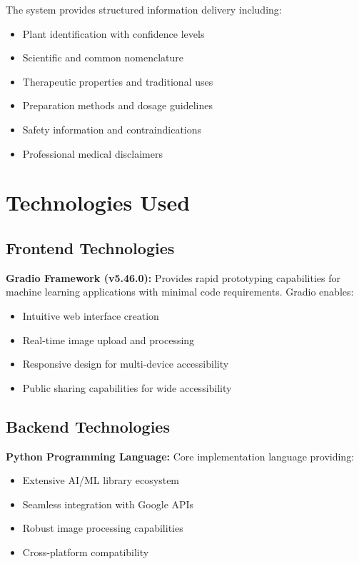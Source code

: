 \documentclass[conference]{IEEEtran}
\begin{document}
The system provides structured information delivery including:

\begin{itemize}
\item Plant identification with confidence levels
\item Scientific and common nomenclature
\item Therapeutic properties and traditional uses
\item Preparation methods and dosage guidelines
\item Safety information and contraindications
\item Professional medical disclaimers
\end{itemize}

\section{Technologies Used}

\subsection{Frontend Technologies}

\textbf{Gradio Framework (v5.46.0):} Provides rapid prototyping capabilities for machine learning applications with minimal code requirements. Gradio enables:
\begin{itemize}
\item Intuitive web interface creation
\item Real-time image upload and processing
\item Responsive design for multi-device accessibility
\item Public sharing capabilities for wide accessibility
\end{itemize}

\subsection{Backend Technologies}

\textbf{Python Programming Language:} Core implementation language providing:
\begin{itemize}
\item Extensive AI/ML library ecosystem
\item Seamless integration with Google APIs
\item Robust image processing capabilities
\item Cross-platform compatibility
\end{itemize}
\end{document}
